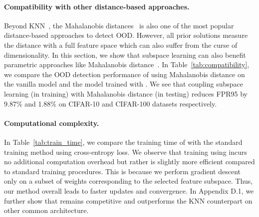 \begin{table}[t]
\small
\centering
{}
\caption{\small \name is also compatible with parametric approaches such as Mahalanobis distance~\cite{lee2018simple}. The model is DenseNet. All values are averaged over six OOD test datasets.}
\label{tab:compatibility}
\end{table}


\paragraph{Compatibility with other distance-based approaches.} 

Beyond KNN~\cite{sun2022knn}, the Mahalanobis distances~\cite{lee2018simple} is also one of the most popular distance-based approaches to detect OOD. 
However, all prior solutions measure the distance with a full feature space which can also suffer from the curse of dimensionality. 
In this section, we show that subspace learning can also benefit parametric approaches like Mahalanobis distance~\cite{lee2018simple}. In Table~\ref{tab:compatibility}, we compare the OOD detection performance of using Mahalanobis distance on the vanilla model and the model trained with \name. 
We see that coupling subspace learning (in training) with Mahalanobis distance (in testing) reduces FPR95 by {9.87\%} and {1.88\%} on CIFAR-10 and CIFAR-100 datasets respectively.


% 
\paragraph{Computational complexity.}  In Table~\ref{tab:train_time}, we compare the training time of \name with the standard training method using cross-entropy loss. We observe that training using \name incurs no additional computation overhead but rather is slightly more efficient compared to standard training procedures. This is because we perform gradient descent only on a subset of weights corresponding to the selected feature subspace. Thus, our method overall leads to faster updates and convergence. {In Appendix D.1, we further show that
\name remains competitive and outperforms the KNN counterpart on other common architecture.}